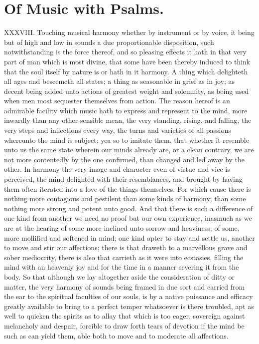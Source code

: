 \section*{Of Music with Psalms.}
XXXVIII. Touching musical harmony whether by instrument or by voice, it being but of high and low in sounds a due proportionable disposition, such notwithstanding is the force thereof, and so pleasing effects it hath in that very part of man which is most divine, that some have been thereby induced to think that the soul itself by nature is or hath in it harmony. A thing which delighteth all ages and beseemeth all states; a thing as seasonable in grief as in joy; as decent being added unto actions of greatest weight and solemnity, as being used when men most sequester themselves from action. The reason hereof is an admirable facility which music hath to express and represent to the mind, more inwardly than any other sensible mean, the very standing, rising, and falling, the  very steps and inflections every way, the turns and varieties of all passions whereunto the mind is subject; yea so to imitate them, that whether it resemble unto us the same state wherein our minds already are, or a clean contrary, we are not more contentedly by the one confirmed, than changed and led away by the other. In harmony the very image and character even of virtue and vice is perceived, the mind delighted with their resemblances, and brought by having them often iterated into a love of the things themselves. For which cause there is nothing more contagious and pestilent than some kinds of harmony; than some nothing more strong and potent unto good. And that there is such a difference of one kind from another we need no proof but our own experience, inasmuch as we are at the hearing of some more inclined unto sorrow and heaviness; of some, more mollified and softened in mind; one kind apter to stay and settle us, another to move and stir our affections; there is that draweth to a marvellous grave and sober mediocrity, there is also that carrieth as it were into ecstasies, filling the mind with an heavenly joy and for the time in a manner severing it from the body. So that although we lay altogether aside the consideration of ditty or matter, the very harmony of sounds being framed in due sort and carried from the ear to the spiritual faculties of our souls, is by a native puissance and efficacy greatly available to bring to a perfect temper whatsoever is there troubled, apt as well to quicken the spirits as to allay that which is too eager, sovereign against melancholy and despair, forcible to draw forth tears of devotion if the mind be such as can yield them, able both to move and to moderate all affections.
